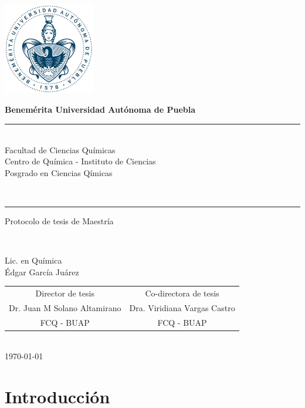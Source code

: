 \documentclass[11pt]{article}
\newcommand\vtab[1][0.5cm]{\vspace*{#1}}
\begin{document}
\pagestyle{empty} 
\phantom{a}
\vspace{-1.4cm}
\begin{center}
\includegraphics[width=4cm]{buap.pdf}

\Large{\textbf{Benemérita Universidad Autónoma de Puebla}\\
\rule{150mm}{0.1mm}\\
Facultad de Ciencias Químicas\\
Centro de Química - Instituto de Ciencias\\
Posgrado en Ciencias Qímicas}\\
\rule{150mm}{0.1mm}

\vtab[.1cm]
\Large{Protocolo de tesis de Maestría}\\
\vtab[0.2cm]

\large{\textbf{}}\\
\vtab[0.2cm]

Lic. en Química \\
Édgar García Juárez \\
\vtab[0.5cm]
\begin{tabular}{cc}
\vtab[10mm]
Director de tesis & Co-directora de tesis \\
Dr. Juan M Solano Altamirano & Dra. Viridiana Vargas Castro \\ 
FCQ - BUAP & FCQ - BUAP \\ 
\end{tabular} 
\vtab[1cm] \\
{\today}
\end{center}

\clearpage

\section{Introducción}
\end{document}
